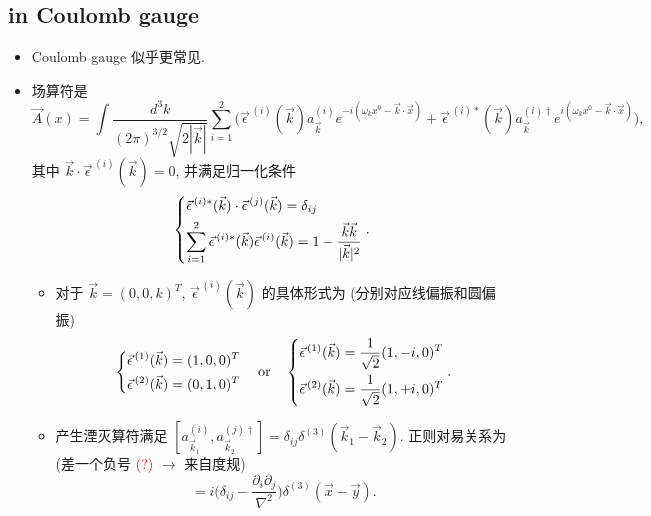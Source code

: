 \subsection{in Coulomb gauge}
\begin{itemize}
	\item Coulomb gauge 似乎更常见.
	
	\item 场算符是
	\begin{equation}
		\vec{A}(x) = \int \frac{d^3 k}{(2 \pi)^{3 / 2} \sqrt{2 |\vec{k}|}} \sum_{i = 1}^2 \Big( \vec{\epsilon}^{\, (i)}(\vec{k}) a^{(i)}_{\vec{k}} e^{- i (\omega_k x^0 - \vec{k} \cdot \vec{x})} + \vec{\epsilon}^{\, (i) *}(\vec{k}) a^{(i) \dag}_{\vec{k}} e^{i (\omega_k x^0 - \vec{k} \cdot \vec{x})} \Big),
	\end{equation}
	其中 $\vec{k} \cdot \vec{\epsilon}^{\, (i)}(\vec{k}) = 0$, 并满足归一化条件
	\begin{equation}
		\begin{dcases}
			\vec{\epsilon}^{\, (i) *}(\vec{k}) \cdot \vec{\epsilon}^{\, (j)}(\vec{k}) = \delta_{i j} \\
			\sum_{i = 1}^2 \vec{\epsilon}^{\, (i) *}(\vec{k}) \vec{\epsilon}^{\, (i)}(\vec{k}) = 1 - \frac{\vec{k} \vec{k}}{|\vec{k}|^2}
		\end{dcases}.
	\end{equation}
	\begin{itemize}
		\item 对于 $\vec{k} = (0, 0, k)^T$, $\vec{\epsilon}^{\, (i)}(\vec{k})$ 的具体形式为 (分别对应线偏振和圆偏振)
		\begin{equation}
			\begin{dcases}
				\vec{\epsilon}^{\, (1)}(\vec{k}) = (1, 0, 0)^T \\
				\vec{\epsilon}^{\, (2)}(\vec{k}) = (0, 1, 0)^T
			\end{dcases} \quad \text{or} \quad \begin{dcases}
				\vec{\epsilon}^{\, (1)}(\vec{k}) = \frac{1}{\sqrt{2}} (1, - i, 0)^T \\
				\vec{\epsilon}^{\, (2)}(\vec{k}) = \frac{1}{\sqrt{2}} (1, + i, 0)^T
			\end{dcases}.
		\end{equation}
		
		\item 产生湮灭算符满足 $[a^{(i)}_{\vec{k}_1}, a^{(j) \dag}_{\vec{k}_2}] = \delta_{i j} \delta^{(3)}(\vec{k}_1 - \vec{k}_2)$. 正则对易关系为 (差一个负号 \textcolor{red}{(?)} $\rightarrow$ 来自度规)
		\begin{equation}
			[\pi_i(t, \vec{x}), A_j(t, \vec{y})] = i \Big( \delta_{i j} - \frac{\partial_i \partial_j}{\nabla^2} \Big) \delta^{(3)}(\vec{x} - \vec{y}).
		\end{equation}
		

\end{itemize}
\end{itemize}
